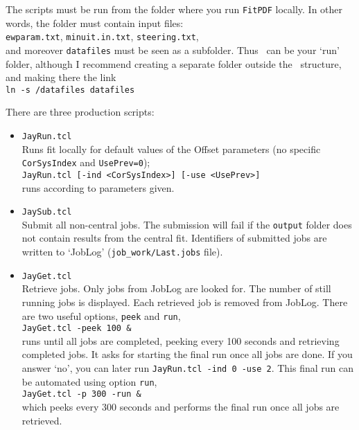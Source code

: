 The scripts must be run from the folder where you run \texttt{FitPDF} locally. 
In other words, the folder must contain input files:\\
\texttt{ewparam.txt},
\texttt{minuit.in.txt},
\texttt{steering.txt},\\
and moreover 
\texttt{datafiles} must be seen as a subfolder. 
Thus \HF\ can be your `run' folder, although I recommend creating a separate folder 
outside the \fitter\ structure, and making there the link\\
\texttt{ln -s \HF/datafiles datafiles}

There are three production scripts:
\begin{itemize}
\item \texttt{JayRun.tcl}\\
Runs fit locally for default values of the Offset parameters
(no specific \verb'CorSysIndex' and \verb'UsePrev=0');\\
\verb'JayRun.tcl [-ind <CorSysIndex>] [-use <UsePrev>]'\\
runs according to parameters given.

\item \texttt{JaySub.tcl}\\
Submit all non-central jobs.
The submission will fail if the \verb'output' folder
does not contain results from the central fit.
Identifiers of submitted jobs are written to `JobLog' (\verb'job_work/Last.jobs' file).

\item \texttt{JayGet.tcl}\\
Retrieve jobs. Only jobs from JobLog are looked for.
The number of still running jobs is displayed. 
Each retrieved job is removed from JobLog.
There are two useful options, \texttt{peek} and \texttt{run}, \eg\\
\verb'JayGet.tcl -peek 100 &'\\
runs until all jobs are completed, peeking every 100 seconds and retrieving completed jobs.
It asks for starting the final run once all jobs are done.
If you answer `no', you can later run \verb'JayRun.tcl -ind 0 -use 2'.
This final run can be automated using option \texttt{run}, \eg\\
\verb'JayGet.tcl -p 300 -run &'\\
which peeks every 300 seconds and performs the final run once all jobs are retrieved.
\end{itemize}

